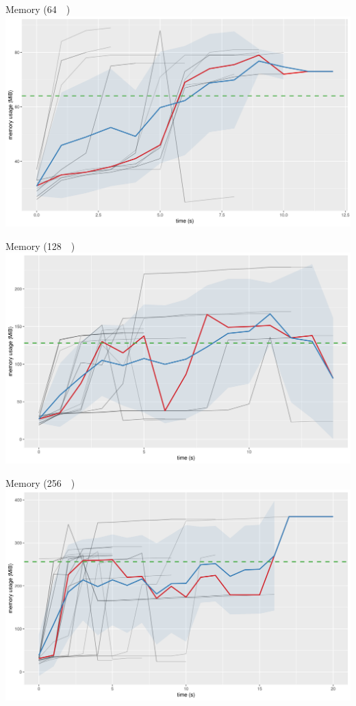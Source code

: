 \documentclass{beamer}
\begin{document}
\begin{frame}{Memory (\SI{64}{\mebi\byte})}
  \includegraphics[width=\textwidth]{../../plots/heap_64.png}
\end{frame}

\begin{frame}{Memory (\SI{128}{\mebi\byte})}
  \includegraphics[width=\textwidth]{../../plots/heap_128.png}
\end{frame}

\begin{frame}{Memory (\SI{256}{\mebi\byte})}
  \includegraphics[width=\textwidth]{../../plots/heap_256.png}
\end{frame}
\end{document}
